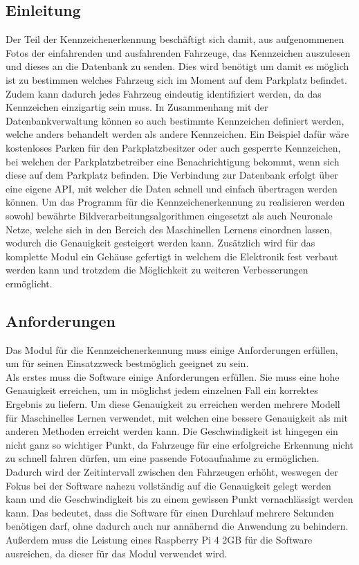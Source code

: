 \def \sectionauthors {Samuel Bleiner}
\subsection{Einleitung}
Der Teil der Kennzeichenerkennung beschäftigt sich damit, aus aufgenommenen Fotos der einfahrenden und ausfahrenden Fahrzeuge, 
das Kennzeichen auszulesen und dieses an die Datenbank zu senden. Dies wird benötigt um damit es möglich ist zu bestimmen welches 
Fahrzeug sich im Moment auf dem Parkplatz befindet. Zudem kann dadurch jedes Fahrzeug eindeutig identifiziert werden, da das Kennzeichen 
einzigartig sein muss.  In Zusammenhang mit der Datenbankverwaltung können so auch bestimmte Kennzeichen definiert werden, welche anders 
behandelt werden als andere Kennzeichen. Ein Beispiel dafür wäre kostenloses Parken für den Parkplatzbesitzer oder auch gesperrte Kennzeichen, 
bei welchen der Parkplatzbetreiber eine Benachrichtigung bekommt, wenn sich diese auf dem Parkplatz befinden. Die Verbindung zur Datenbank 
erfolgt über eine eigene API, mit welcher die Daten schnell und einfach übertragen werden können. Um das Programm für die Kennzeichenerkennung 
zu realisieren werden sowohl bewährte Bildverarbeitungsalgorithmen eingesetzt als auch Neuronale Netze, welche sich in den Bereich des 
Maschinellen Lernens einordnen lassen, wodurch die Genauigkeit gesteigert werden kann. Zusätzlich wird für das komplette Modul ein Gehäuse 
gefertigt in welchem die Elektronik fest verbaut werden kann und trotzdem die Möglichkeit zu weiteren Verbesserungen ermöglicht.

\subsection{Anforderungen}
Das Modul für die Kennzeichenerkennung muss einige Anforderungen erfüllen, um für seinen Einsatzzweck bestmöglich geeignet zu sein.\\

Als erstes muss die Software einige Anforderungen erfüllen. Sie muss eine hohe Genauigkeit erreichen, um in möglichst jedem einzelnen Fall 
ein korrektes Ergebnis zu liefern. Um diese Genauigkeit zu erreichen werden mehrere Modell für Maschinelles Lernen verwendet, mit welchen 
eine bessere Genauigkeit als mit anderen Methoden erreicht werden kann. Die Geschwindigkeit ist hingegen ein nicht ganz so wichtiger Punkt, 
da Fahrzeuge für eine erfolgreiche Erkennung nicht zu schnell fahren dürfen, um eine passende Fotoaufnahme zu ermöglichen. Dadurch wird der 
Zeitintervall zwischen den Fahrzeugen erhöht, weswegen der Fokus bei der Software nahezu vollständig auf die Genauigkeit gelegt werden kann 
und die Geschwindigkeit bis zu einem gewissen Punkt vernachlässigt werden kann. Das bedeutet, dass die Software für einen Durchlauf mehrere 
Sekunden benötigen darf, ohne dadurch auch nur annähernd die Anwendung zu behindern. Außerdem muss die Leistung eines Raspberry Pi 4 2GB für 
die Software ausreichen, da dieser für das Modul verwendet wird.\\

